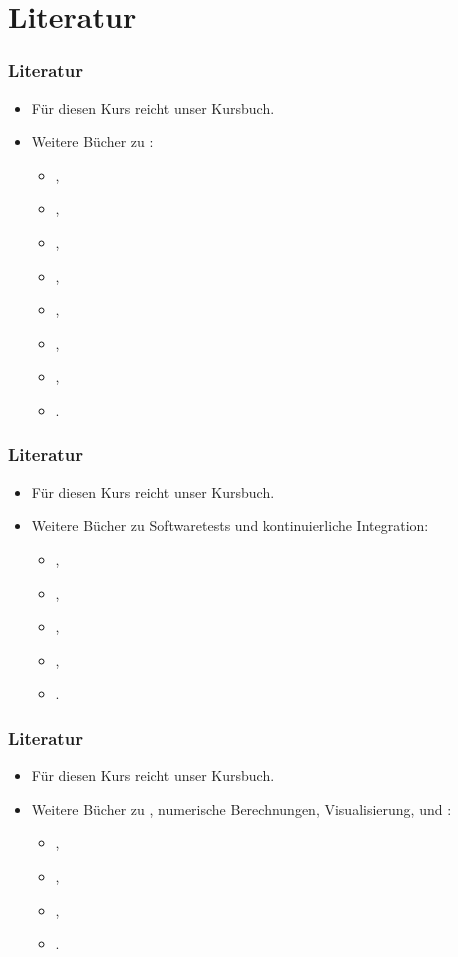 \documentclass[aspectratio=169,mathserif,notheorems]{beamer}%
\begin{document}
\section{Literatur}%
%
\begin{frame}[t]\frametitle{Literatur}%
\begin{itemize}%
\item Für diesen Kurs reicht unser Kursbuch\cite{programmingWithPython}.%
\item<2-> Weitere Bücher zu \python:\begin{itemize}%
\item {},%
\item {},%
\item {},%
\item {},%
\item {},%
\item {},%
\item {},%
\item {}.%
\end{itemize}%
\end{itemize}%
\end{frame}%
%
\begin{frame}[t]\frametitle{Literatur}%
\begin{itemize}%
\item Für diesen Kurs reicht unser Kursbuch\cite{programmingWithPython}.%
\item Weitere Bücher zu Softwaretests und kontinuierliche Integration:\begin{itemize}%
\item {},%
\item {},%
\item {},%
\item {},%
\item {}.%
\end{itemize}%
\end{itemize}%
\end{frame}%
%
\begin{frame}[t]\frametitle{Literatur}%
\begin{itemize}%
\item Für diesen Kurs reicht unser Kursbuch\cite{programmingWithPython}.%
\item Weitere Bücher zu , numerische Berechnungen, Visualisierung, und :\begin{itemize}%
\item {},%
\item {},%
\item {},%
\item {}.%
\end{itemize}%
\end{itemize}%
\end{frame}%
\end{document}
